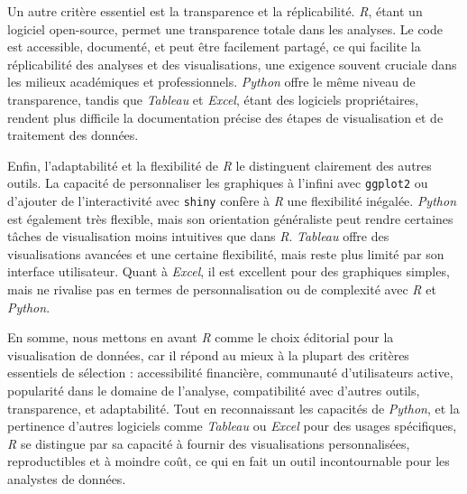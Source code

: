 \documentclass[
  letterpaper,
  DIV=11,
  numbers=noendperiod]{scrreprt}
\begin{document}
Un autre critère essentiel est la transparence et la réplicabilité.
\emph{R}, étant un logiciel open-source, permet une transparence totale
dans les analyses. Le code est accessible, documenté, et peut être
facilement partagé, ce qui facilite la réplicabilité des analyses et des
visualisations, une exigence souvent cruciale dans les milieux
académiques et professionnels. \emph{Python} offre le même niveau de
transparence, tandis que \emph{Tableau} et \emph{Excel}, étant des
logiciels propriétaires, rendent plus difficile la documentation précise
des étapes de visualisation et de traitement des données.

Enfin, l'adaptabilité et la flexibilité de \emph{R} le distinguent
clairement des autres outils. La capacité de personnaliser les
graphiques à l'infini avec \texttt{ggplot2} ou d'ajouter de
l'interactivité avec \texttt{shiny} confère à \emph{R} une flexibilité
inégalée. \emph{Python} est également très flexible, mais son
orientation généraliste peut rendre certaines tâches de visualisation
moins intuitives que dans \emph{R}. \emph{Tableau} offre des
visualisations avancées et une certaine flexibilité, mais reste plus
limité par son interface utilisateur. Quant à \emph{Excel}, il est
excellent pour des graphiques simples, mais ne rivalise pas en termes de
personnalisation ou de complexité avec \emph{R} et \emph{Python}.

En somme, nous mettons en avant \emph{R} comme le choix éditorial pour
la visualisation de données, car il répond au mieux à la plupart des
critères essentiels de sélection : accessibilité financière, communauté
d'utilisateurs active, popularité dans le domaine de l'analyse,
compatibilité avec d'autres outils, transparence, et adaptabilité. Tout
en reconnaissant les capacités de \emph{Python}, et la pertinence
d'autres logiciels comme \emph{Tableau} ou \emph{Excel} pour des usages
spécifiques, \emph{R} se distingue par sa capacité à fournir des
visualisations personnalisées, reproductibles et à moindre coût, ce qui
en fait un outil incontournable pour les analystes de données.
\end{document}
